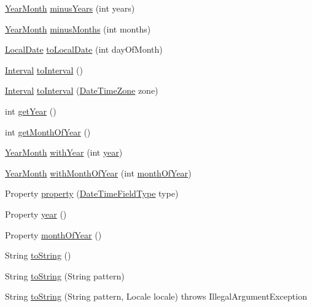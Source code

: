 \begin{DoxyCompactItemize}
\item 
\hyperlink{classorg_1_1joda_1_1time_1_1_year_month}{Year\-Month} \hyperlink{classorg_1_1joda_1_1time_1_1_year_month_a816474b7664a0045ca3281283978ffef}{minus\-Years} (int years)
\item 
\hyperlink{classorg_1_1joda_1_1time_1_1_year_month}{Year\-Month} \hyperlink{classorg_1_1joda_1_1time_1_1_year_month_ad4f4568778f75d494eb72bb2677d31db}{minus\-Months} (int months)
\item 
\hyperlink{classorg_1_1joda_1_1time_1_1_local_date}{Local\-Date} \hyperlink{classorg_1_1joda_1_1time_1_1_year_month_a54597dd4b2e76910fc17e5f383e3463e}{to\-Local\-Date} (int day\-Of\-Month)
\item 
\hyperlink{classorg_1_1joda_1_1time_1_1_interval}{Interval} \hyperlink{classorg_1_1joda_1_1time_1_1_year_month_a6703f8c7c5dc5b740dde53adda9b568e}{to\-Interval} ()
\item 
\hyperlink{classorg_1_1joda_1_1time_1_1_interval}{Interval} \hyperlink{classorg_1_1joda_1_1time_1_1_year_month_a0730f76e5200b7008bf22b108cec54c3}{to\-Interval} (\hyperlink{classorg_1_1joda_1_1time_1_1_date_time_zone}{Date\-Time\-Zone} zone)
\item 
int \hyperlink{classorg_1_1joda_1_1time_1_1_year_month_a095bac94ef30cfb39d5891cc4372f050}{get\-Year} ()
\item 
int \hyperlink{classorg_1_1joda_1_1time_1_1_year_month_a0b3bef0cf3e59a9af37b2b15e38baac8}{get\-Month\-Of\-Year} ()
\item 
\hyperlink{classorg_1_1joda_1_1time_1_1_year_month}{Year\-Month} \hyperlink{classorg_1_1joda_1_1time_1_1_year_month_a35fa43947d843082ae48e3ac410c86aa}{with\-Year} (int \hyperlink{classorg_1_1joda_1_1time_1_1_year_month_a2c80ff29652d131575224c5aed2be17b}{year})
\item 
\hyperlink{classorg_1_1joda_1_1time_1_1_year_month}{Year\-Month} \hyperlink{classorg_1_1joda_1_1time_1_1_year_month_a2a92d589dc8ea3d8c7e21a7513de01fa}{with\-Month\-Of\-Year} (int \hyperlink{classorg_1_1joda_1_1time_1_1_year_month_a9c980b9a1d39f8d5dfdfe96fc983c0fb}{month\-Of\-Year})
\item 
Property \hyperlink{classorg_1_1joda_1_1time_1_1_year_month_a36f50f9b27a7c0907fe83ebb80f7fb7f}{property} (\hyperlink{classorg_1_1joda_1_1time_1_1_date_time_field_type}{Date\-Time\-Field\-Type} type)
\item 
Property \hyperlink{classorg_1_1joda_1_1time_1_1_year_month_a2c80ff29652d131575224c5aed2be17b}{year} ()
\item 
Property \hyperlink{classorg_1_1joda_1_1time_1_1_year_month_a9c980b9a1d39f8d5dfdfe96fc983c0fb}{month\-Of\-Year} ()
\item 
String \hyperlink{classorg_1_1joda_1_1time_1_1_year_month_a9803da56a7afe9058985c62146d0de72}{to\-String} ()
\item 
String \hyperlink{classorg_1_1joda_1_1time_1_1_year_month_a33632b9b0336b4fe3fdd2361730ddd1c}{to\-String} (String pattern)
\item 
String \hyperlink{classorg_1_1joda_1_1time_1_1_year_month_a6d7f1a8efdada36fc309756d13abcc28}{to\-String} (String pattern, Locale locale)  throws Illegal\-Argument\-Exception 
\end{DoxyCompactItemize}
